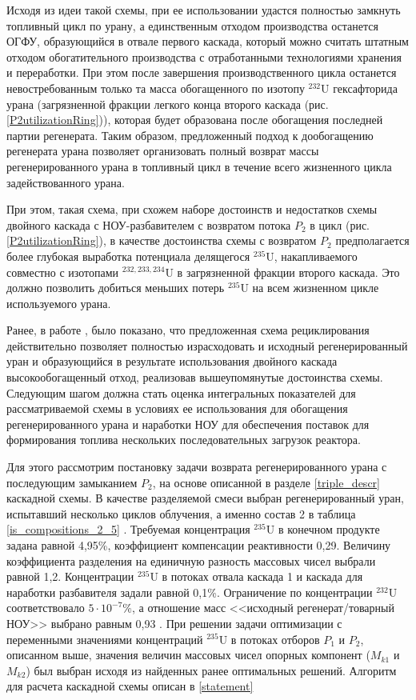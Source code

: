 Исходя из идеи такой схемы, при ее использовании удастся полностью замкнуть топливный цикл по урану, а единственным отходом производства останется ОГФУ, образующийся в отвале первого каскада, который можно считать штатным отходом обогатительного производства с отработанными технологиями хранения и переработки. При этом после завершения производственного цикла останется невостребованным только та масса обогащенного по изотопу $^{232}$U гексафторида урана (загрязненной фракции легкого конца второго каскада (рис. \ref{P2utilizationRing})), которая будет образована после обогащения последней партии регенерата. Таким образом, предложенный подход к дообогащению регенерата урана позволяет организовать полный возврат массы регенерированного урана в топливный цикл в течение всего жизненного цикла задействованного урана.

При этом, такая схема, при схожем наборе достоинств и недостатков схемы двойного каскада с НОУ-разбавителем с возвратом потока $P_2$ в цикл (рис. \ref{P2utilizationRing}), в качестве достоинства схемы с возвратом $P_2$ предполагается более глубокая выработка потенциала делящегося $^{235}$U, накапливаемого совместно с изотопами $^{232,233,234}$U в загрязненной фракции второго каскада. Это должно позволить добиться меньших потерь $^{235}$U на всем жизненном цикле используемого урана.


Ранее, в работе \cite{nevinicaToplivnyyCiklLegkovodnogo2019}, было показано, что предложенная схема рециклирования действительно позволяет полностью израсходовать и исходный регенерированный уран и образующийся в результате использования двойного каскада высокообогащенный отход, реализовав вышеупомянутые достоинства схемы. Следующим шагом должна стать оценка интегральных показателей для рассматриваемой схемы в условиях ее использования для обогащения регенерированного урана и наработки НОУ для обеспечения поставок для формирования топлива нескольких последовательных загрузок реактора.

Для этого рассмотрим постановку задачи возврата регенерированного урана с последующим замыканием $P_2$, на основе описанной в разделе \ref{triple_descr} каскадной схемы. В качестве разделяемой смеси выбран регенерированный уран, испытавший несколько циклов облучения, а именно состав 2 в таблица \ref{is_compositions_2_5} \cite{smirnovObogashchenieRegenerirovannogoUrana2018}. Требуемая концентрация $^{235}$U в конечном продукте задана равной 4,95\%, коэффициент компенсации реактивности 0,29. Величину коэффициента разделения на единичную разность массовых чисел выбрали равной 1,2. Концентрации $^{235}$U в потоках отвала каскада 1 и каскада для наработки разбавителя задали равной 0,1\%. Ограничение по концентрации $^{232}$U соответствовало $5\cdot10^{-7} \%$, а отношение масс <<исходный регенерат/товарный НОУ>> выбрано равным 0,93 \cite{smirnovObogashchenieRegenerirovannogoUrana2018}.  При решении задачи оптимизации с переменными значениями концентраций $^{235}$U в потоках отборов $P_1$ и $P_2$, описанном выше, значения величин массовых чисел опорных компонент ($M_{k1}$ и $M_{k2}$) был выбран исходя из найденных ранее оптимальных решений. Алгоритм для расчета каскадной схемы описан в \ref{statement}

